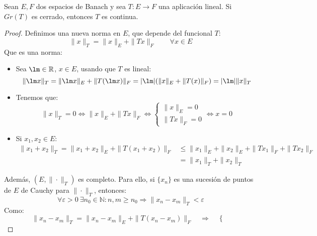 \begin{teo}
    Sean $E,F$ dos espacios de Banach y sea $T:E\to F$ una aplicación lineal. Si $Gr(T)$ es cerrado, entonces $T$ es continua.
    \begin{proof}
        Definimos una nueva norma en $E$, que depende del funcional $T$:
        \begin{equation*}
            \|x\|_T = \|x\|_E + \|Tx\|_F \qquad \forall x\in E
        \end{equation*}
        Que es una norma:
        \begin{itemize}
            \item Sea $\lm\in \mathbb{R}$, $x\in E$, usando que $T$ es lineal:
                \begin{equation*}
                    \|\lm x\|_T = \|\lm x\|_E + \|T(\lm x)\|_F = |\lm| (\|x\|_E + \|T(x)\|_F) = |\lm| \|x\|_T
                \end{equation*}
            \item Tenemos que:
                \begin{equation*}
                    \|x\|_T = 0 \Longleftrightarrow \|x\|_E + \|Tx\|_F \Longleftrightarrow \left\{\begin{array}{l}
                        \|x\|_E = 0 \\
                        \|Tx\|_F = 0
                    \end{array}\right. \Longleftrightarrow x = 0
                \end{equation*}
            \item Si $x_1,x_2\in E$:
                \begin{align*}
                    \|x_1 + x_2\|_T = \|x_1 + x_2\|_E + \|T(x_1+x_2)\|_F &\leq \|x_1\|_E + \|x_2\|_E + \|Tx_1\|_F + \|Tx_2\|_F \\
                                    &= \|x_1\|_T + \|x_2\|_T
                \end{align*}
        \end{itemize}
        Además, $(E,\|\cdot \|_T)$ es completo. Para ello, si $\{x_n\}$ es una sucesión de puntos de $E$ de Cauchy para $\|\cdot \|_T$, entonces:
        \begin{equation*}
            \forall \varepsilon>0~\exists n_0\in \mathbb{N} : n,m\geq n_0 \Longrightarrow \|x_n-x_m\|_T < \varepsilon
        \end{equation*}
        Como:
        \begin{equation*}
            \|x_n - x_m\|_T = \|x_n - x_m\|_E + \|T(x_n - x_m)\|_F \quad \Longrightarrow \quad  \left\{\begin{array}{l}

\end{array}
\end{equation*}
\end{proof}
\end{teo}
